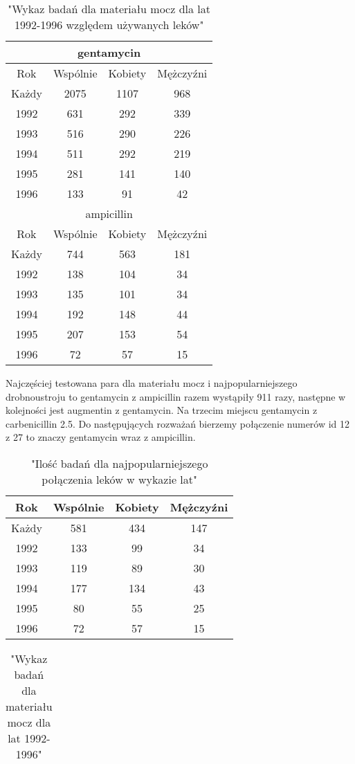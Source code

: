 \documentclass[a4paper,11pt]{article}
\begin{document}
\begin{table}[h]
  \begin{center}
  \caption{"Wykaz badań dla materiału mocz dla lat 1992-1996 względem używanych leków"}
  \begin{tabular}{|c|c|c|c|}
    \hline
    \multicolumn{4}{|c|}{gentamycin} \\ 
    \hline Rok &Wspólnie & Kobiety & Mężczyźni \\ \hline
Każdy& 2075& 1107& 968 \\ \hline 
1992& 631& 292& 339 \\ \hline
1993& 516& 290& 226 \\ \hline
1994& 511& 292& 219 \\ \hline
1995& 281& 141& 140 \\ \hline
1996& 133& 91& 42 \\ \hline
\multicolumn{4}{|c|}{ampicillin} \\ 
\hline Rok &Wspólnie & Kobiety & Mężczyźni \\ \hline
Każdy& 744& 563& 181 \\ \hline 
1992& 138& 104& 34 \\ \hline
1993& 135& 101& 34 \\ \hline
1994& 192& 148& 44 \\ \hline
1995& 207& 153& 54 \\ \hline
1996& 72& 57& 15 \\ \hline
  \end{tabular}
\end{center}
\end{table}

Najczęściej testowana para dla materiału mocz i najpopularniejszego drobnoustroju to gentamycin z ampicillin razem wystąpiły 911 razy,
 następne w kolejności jest augmentin z gentamycin. Na trzecim miejscu gentamycin z carbenicillin 2.5.
Do następujących rozważań bierzemy połączenie numerów id 12 z 27 to znaczy gentamycin wraz z ampicillin.


\begin{table}[h]
  \begin{center}
  \caption{"Ilość badań dla najpopularniejszego połączenia leków w wykazie lat"}
  \begin{tabular}{|c|c|c|c|}
\hline Rok &Wspólnie & Kobiety & Mężczyźni \\ \hline
Każdy& 581& 434& 147 \\ \hline 
1992& 133& 99& 34 \\ \hline
1993& 119& 89& 30 \\ \hline
1994& 177& 134& 43 \\ \hline
1995& 80& 55& 25 \\ \hline
1996& 72& 57& 15 \\ \hline

  \end{tabular}
\end{center}
\end{table}


\begin{table}[h]
  \begin{center}
  \caption{"Wykaz badań dla materiału mocz dla lat 1992-1996"}
  \begin{tabular}{|c|c|c|c|}

  \end{tabular}
\end{center}
\end{table}
\end{document}
